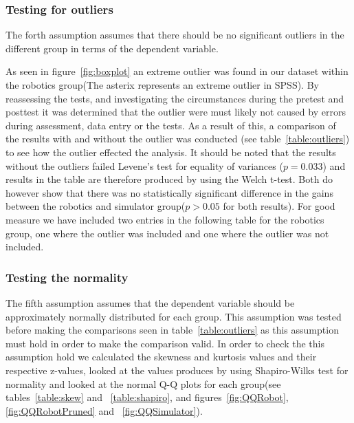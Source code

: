 \subsubsection*{Testing for outliers}\label{sec:outliers}
The forth assumption assumes that there should be no significant outliers in the different group in terms of the dependent variable. 


\bigskip\noindent
As seen in figure~\ref{fig:boxplot} an extreme outlier was found in our dataset within the robotics group(The asterix represents an extreme outlier in SPSS). 
By reassessing the tests, and investigating the circumstances during the pretest and posttest it was determined that the outlier were must likely not caused by errors during assessment, data entry or the tests. 
As a result of this, a comparison of the results with and without the outlier was conducted (see table~\ref{table:outliers}) to see how the outlier effected the analysis. 
It should be noted that the results without the outliers failed Levene's test for equality of variances ($p = 0.033$) and results in the table are therefore produced by using the Welch t-test. 
Both do however show that there was no statistically significant difference in the gains between the robotics and simulator group($p > 0.05$ for both results).
For good measure we have included two entries in the following table for the robotics group, one where the outlier was included and one where the outlier was not included.


\bigskip\noindent
{}

\subsubsection*{Testing the normality}\label{sec:normality}
The fifth assumption assumes that the dependent variable should be approximately normally distributed for each group. This assumption was tested before making the comparisons seen in table~\ref{table:outliers} as this assumption must hold in order to make the comparison valid. 
In order to check the this assumption hold we calculated the skewness and kurtosis values and their respective z-values, looked at the values produces by using Shapiro-Wilks test for normality and looked at the normal Q-Q plots for each group(see tables~\ref{table:skew} and ~\ref{table:shapiro}, and figures~\ref{fig:QQRobot},\ref{fig:QQRobotPruned} and ~\ref{fig:QQSimulator}).

